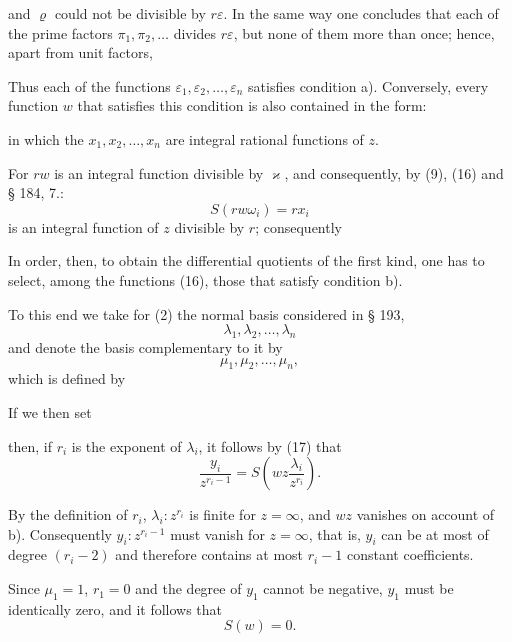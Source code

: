and $\varrho$ could not be divisible by $r\varepsilon$. In the same way one concludes
that each of the prime factors $\pi_1, \pi_2, \ldots$ divides $r\varepsilon$, but none
of them more than once; hence, apart from unit factors,


Thus each of the functions $\varepsilon_1, \varepsilon_2, \ldots, \varepsilon_n$ satisfies condition a).
Conversely, every function $w$ that satisfies this condition is also
contained in the form:


in which the $x_1, x_2, \ldots, x_n$ are integral rational functions of $z$.

For $rw$ is an integral function divisible by $\varkappa$, and
consequently, by (9), (16) and § 184, 7.:
\[
S(rw\omega_i) = rx_i
\]
is an integral function of $z$ divisible by $r$; consequently


In order, then, to obtain the differential quotients of the first
kind, one has to select, among the functions (16), those that
satisfy condition b).

To this end we take for (2) the normal basis considered in § 193,
\[
\lambda_1, \lambda_2, \ldots, \lambda_n
\]
and denote the basis complementary to it by
\[
\mu_1, \mu_2, \ldots, \mu_n,
\]
which is defined by


If we then set


then, if $r_i$ is the exponent of $\lambda_i$, it follows by (17) that
\[
\frac{y_i}{z^{r_i-1}} = S\!\left(wz\frac{\lambda_i}{z^{r_i}}\right)\!.
\]

By the definition of $r_i$, $\lambda_i:z^{r_i}$ is finite for $z=\infty$, and
$wz$ vanishes on account of b). Consequently $y_i:z^{r_i-1}$ must vanish
for $z=\infty$, that is, $y_i$ can be at most of degree $(r_i-2)$
and therefore contains at most $r_i-1$ constant coefficients.

Since $\mu_1=1$, $r_1=0$ and the degree of $y_1$ cannot be
negative, $y_1$ must be identically zero, and it follows that
\[
S(w) = 0.
\]
